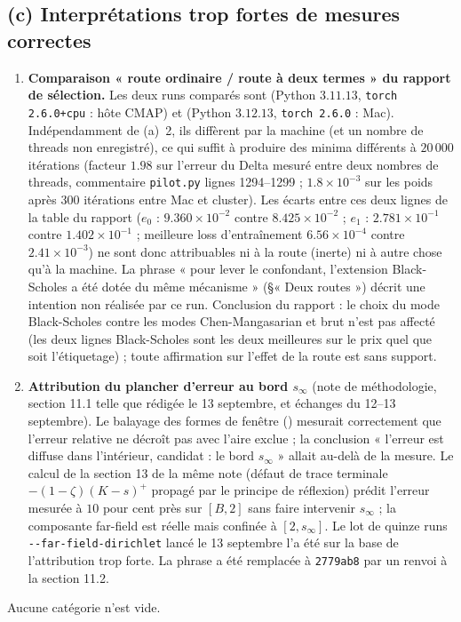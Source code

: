 \documentclass[11pt]{article}
\newcommand{\code}[1]{\texttt{#1}}
\begin{document}
\subsection*{(c) Interprétations trop fortes de mesures correctes}

\begin{enumerate}
\item \textbf{Comparaison « route ordinaire / route à deux termes » du
  rapport de sélection.} Les deux runs comparés sont
   (Python $3.11.13$,
  \code{torch 2.6.0+cpu} : hôte CMAP) et
   (Python $3.12.13$,
  \code{torch 2.6.0} : Mac). Indépendamment de (a)~2, ils diffèrent par la
  machine (et un nombre de threads non enregistré), ce qui suffit à produire
  des minima différents à $20\,000$ itérations (facteur $1.98$ sur l'erreur du
  Delta mesuré entre deux nombres de threads, commentaire \code{pilot.py}
  lignes 1294--1299 ; $1.8\times10^{-3}$ sur les poids après $300$ itérations
  entre Mac et cluster). Les écarts entre ces deux lignes de la table du
  rapport ($e_0$ : $9.360\times10^{-2}$ contre $8.425\times10^{-2}$ ; $e_1$ :
  $2.781\times10^{-1}$ contre $1.402\times10^{-1}$ ; meilleure loss d'entraînement
  $6.56\times10^{-4}$ contre $2.41\times10^{-3}$) ne sont donc attribuables ni
  à la route (inerte) ni à autre chose qu'à la machine. La phrase « pour lever
  le confondant, l'extension Black-Scholes a été dotée du même mécanisme »
  (\S« Deux routes ») décrit une intention non réalisée par ce run. Conclusion
  du rapport : le choix du mode Black-Scholes contre les modes Chen-Mangasarian
  et brut n'est pas affecté (les deux lignes Black-Scholes sont les deux
  meilleures sur le prix quel que soit l'étiquetage) ; toute affirmation sur
  l'effet de la route est sans support.
\item \textbf{Attribution du plancher d'erreur au bord $s_\infty$}
  (note de méthodologie, section 11.1 telle que rédigée le 13 septembre, et
  échanges du 12--13 septembre). Le balayage des formes de fenêtre
  () mesurait
  correctement que l'erreur relative ne décroît pas avec l'aire exclue ; la
  conclusion « l'erreur est diffuse dans l'intérieur, candidat : le bord
  $s_\infty$ » allait au-delà de la mesure. Le calcul de la section 13 de la
  même note (défaut de trace terminale $-(1-\zeta)(K-s)^+$ propagé par le
  principe de réflexion) prédit l'erreur mesurée à $10$ pour cent près sur
  $[B,2]$ sans faire intervenir $s_\infty$ ; la composante far-field est
  réelle mais confinée à $[2,s_\infty]$. Le lot de quinze runs
  \code{-{}-far-field-dirichlet} lancé le 13 septembre l'a été sur la base de
  l'attribution trop forte. La phrase a été remplacée à \code{2779ab8} par un
  renvoi à la section 11.2.
\end{enumerate}

\noindent Aucune catégorie n'est vide.
\end{document}
